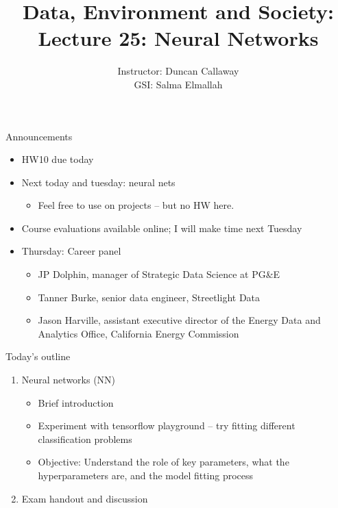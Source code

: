 \documentclass[mathserif, aspectratio=169]{beamer}
\title[Lecture 25] 
{Data, Environment and Society: \\{Lecture 25: Neural Networks}}
\author[ER131: Data, Environment and Society] 
{Instructor: Duncan Callaway\\
GSI: Salma Elmallah}
\institute[UC Berkeley] %
 {\small{ \bf November 26, 2019}}
\date[November 26, 2019]
\begin{document}
\frame{
	\titlepage
}


\begin{frame}{Announcements}
	\begin{itemize}
		\item HW10 due today
		\item Next today and tuesday: neural nets
		\begin{itemize}
			\item Feel free to use on projects -- but no HW here.
		\end{itemize}
		\item Course evaluations available online; I will make time next Tuesday
		\item Thursday: Career panel
		\begin{itemize}
			\item JP Dolphin, manager of Strategic Data Science at PG\&E
			\item Tanner Burke, senior data engineer, Streetlight Data
			\item Jason Harville, assistant executive director of the Energy Data and Analytics Office, California Energy Commission
		\end{itemize}
	\end{itemize}
\end{frame}


\begin{frame}{Today's outline}
	\begin{enumerate}
		\item Neural networks (NN) 
		\begin{itemize}
			\item  Brief introduction
			\item Experiment with tensorflow playground -- try fitting different classification problems
			\item Objective: Understand the role of key parameters, what the hyperparameters are, and the model fitting process
		\end{itemize}
		\item Exam handout and discussion
	\end{enumerate}
\end{frame}
\end{document}
